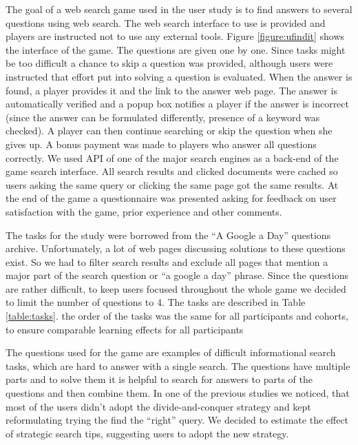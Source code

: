 \documentclass{sig-alternate}
\begin{document}
The goal of a web search game used in the user study is to find answers to several questions using web search.
The web search interface to use is provided and players are instructed not to use any external tools.
Figure \ref{figure:ufindit} shows the interface of the game.
The questions are given one by one.
Since tasks might be too difficult a chance to skip a question was provided, although users were instructed that effort put into solving a question is evaluated.
When the answer is found, a player provides it and the link to the answer web page.
The answer is automatically verified and a popup box notifies a player if the answer is incorrect (since the answer can be formulated differently, presence of a keyword was checked).
A player can then continue searching or skip the question when she gives up.
A bonus payment was made to players who answer all questions correctly.
We used API of one of the major search engines as a back-end of the game search interface.
All search results and clicked documents were cached so users asking the same query or clicking the same page got the same results.
At the end of the game a questionnaire was presented asking for feedback on user satisfaction with the game, prior experience and other comments.

The tasks for the study were borrowed from the ``A Google a Day'' questions archive.
Unfortunately, a lot of web pages discussing solutions to these questions exist.
So we had to filter search results and exclude all pages that mention a major part of the search question or ``a google a day'' phrase.
Since the questions are rather difficult, to keep users focused throughout the whole game we decided to limit the number of questions to 4.
The tasks are described in Table \ref{table:tasks}.
the order of the tasks was the same for all participants and cohorts, to ensure comparable learning effects for all participants

The questions used for the game are examples of difficult informational search tasks, which are hard to answer with a single search.
The questions have multiple parts and to solve them it is helpful to search for answers to parts of the questions and then combine them.
In one of the previous studies we noticed, that most of the users didn't adopt the divide-and-conquer strategy and kept reformulating trying the find the ``right'' query.
We decided to estimate the effect of strategic search tips, suggesting users to adopt the new strategy.
\end{document}
